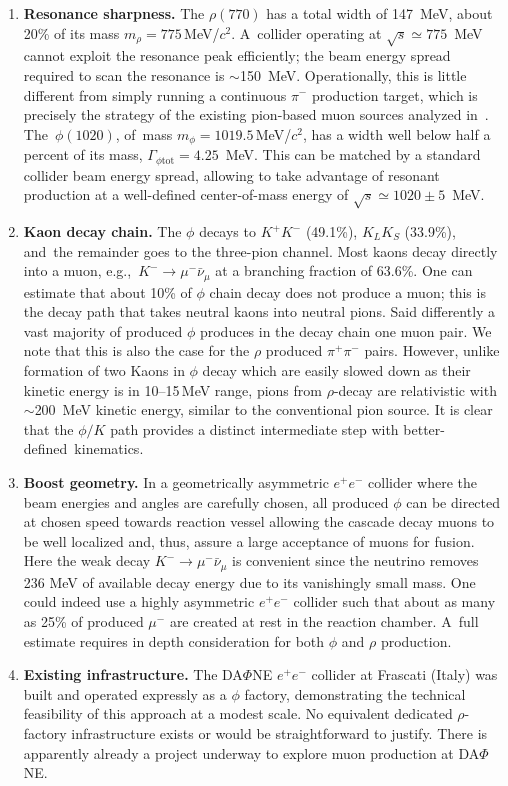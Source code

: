 \documentclass[particles,article,accept,pdftex,moreauthors]{Definitions/mdpi}
\begin{document}
\begin{enumerate}
\item [(1)]
\textbf{Resonance sharpness.} The $\rho(770)$ has a total width of 147~MeV, about 20\% of its mass $m_\rho=775$\,MeV/$c^2$. A~collider operating at $\sqrt{s}\simeq 775$~MeV cannot exploit the resonance peak efficiently; the beam energy spread required to scan the resonance is $\sim$150~MeV. Operationally, this is little different from simply running a continuous $\pi^-$ production target, which is precisely the strategy of the existing pion-based muon sources analyzed in~\cite{Rafelski:1991DOE}. The~$\phi(1020)$, of~mass $m_\phi=1019.5$\,MeV/$c^2$, has a width well below half a percent of its mass, $\Gamma_{\phi\mathrm{tot}} = 4.25$~MeV. This can be matched by a standard collider beam energy spread, allowing to take advantage of resonant production at a well-defined center-of-mass energy of $\sqrt{s}\simeq1020\pm 5$~MeV.
%
\item [(2)]
\textbf{Kaon decay chain.} The $\phi$ decays to $K^+K^-$ (49.1\%), $K_LK_S$ (33.9\%), and~the remainder goes to the three-pion channel. Most kaons decay directly into a muon, e.g.,~\mbox{$K^-\to\mu^-\bar\nu_\mu$} at a branching fraction of 63.6\%. One can estimate that about 10\% of $\phi$ chain decay does not produce a muon; this is the decay path that takes neutral kaons into neutral pions. Said differently a vast majority of produced $\phi$ produces in the decay chain one muon pair. We note that this is also the case for the $\rho$ produced $\pi^+\pi^-$ pairs. However, unlike formation of two Kaons in $\phi$ decay which are easily slowed down as their kinetic energy is in 10--15\,MeV range, pions from $\rho$-decay are relativistic with $\sim$200~MeV kinetic energy, similar to the conventional pion source. It is clear that the $\phi/K$ path provides a distinct intermediate step with better-defined~kinematics.
\item [(3)]
\textbf{Boost geometry.} In a geometrically asymmetric $e^+e^-$ collider where the beam energies and angles are carefully chosen, all produced $\phi$ can be directed at chosen speed towards reaction vessel allowing the cascade decay muons to be well localized and, thus, assure a large acceptance of muons for fusion. Here the weak decay $K^-\to\mu^-\bar\nu_\mu$ is convenient since the neutrino removes 236 MeV of available decay energy due to its vanishingly small mass. One could indeed use a highly asymmetric $e^+e^-$ collider such that about as many as 25\% of produced $\mu^-$ are created at rest in the reaction chamber. A~full estimate requires in depth consideration for both $\phi$ and $\rho$ production.
%
\item [(4)]
\textbf{Existing infrastructure.} The DA$\Phi$NE $e^+e^-$ collider at Frascati (Italy) was built and operated expressly as a $\phi$ factory, demonstrating the technical feasibility of this approach at a modest scale. No equivalent dedicated $\rho$-factory infrastructure exists or would be straightforward to justify. There is apparently already a project underway to explore muon production at DA$\Phi$NE.
\end{enumerate}
\end{document}
